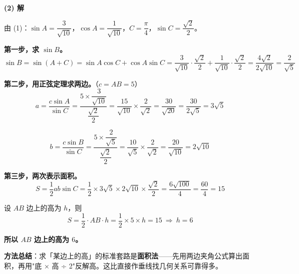 \begin{answer}
\par\medskip

\textbf{(2) 解}

由 (1)：$\sin A=\dfrac3{\sqrt{10}}$，$\cos A=\dfrac1{\sqrt{10}}$，$C=\dfrac\pi4$，$\sin C=\dfrac{\sqrt2}2$。

\textbf{第一步，求 $\sin B$。}
\nopagebreak[4]
\[\sin B=\sin(A+C)=\sin A\cos C+\cos A\sin C=\frac3{\sqrt{10}}\cdot\frac{\sqrt2}2+\frac1{\sqrt{10}}\cdot\frac{\sqrt2}2=\frac{4\sqrt2}{2\sqrt{10}}=\frac{2}{\sqrt5}\]

\textbf{第二步，用正弦定理求两边。}（$c=AB=5$）
\nopagebreak[4]
\[a=\frac{c\sin A}{\sin C}=\frac{5\times\dfrac3{\sqrt{10}}}{\dfrac{\sqrt2}2}=\frac{15}{\sqrt{10}}\times\frac2{\sqrt2}=\frac{30}{\sqrt{20}}=\frac{30}{2\sqrt5}=3\sqrt5\]

\nopagebreak[4]
\[b=\frac{c\sin B}{\sin C}=\frac{5\times\dfrac2{\sqrt5}}{\dfrac{\sqrt2}2}=\frac{10}{\sqrt5}\times\frac2{\sqrt2}=\frac{20}{\sqrt{10}}=2\sqrt{10}\]

\textbf{第三步，两次表示面积。}
\nopagebreak[4]
\[S=\frac12ab\sin C=\frac12\times3\sqrt5\times2\sqrt{10}\times\frac{\sqrt2}2=\frac{6\sqrt{100}}4=\frac{60}4=15\]

设 $AB$ 边上的高为 $h$，则
\nopagebreak[4]
\[S=\frac12\cdot AB\cdot h=\frac12\times5\times h=15\ \Longrightarrow\ h=6\]

\textbf{所以 $AB$ 边上的高为 $6$。}

\begin{gktip}
\textbf{方法总结}：求「某边上的高」的标准套路是\textbf{面积法}——先用两边夹角公式算出面积，再用"底 × 高 ÷ 2"反解高。这比直接作垂线找几何关系可靠得多。
\end{gktip}



\par\medskip

\end{answer}
